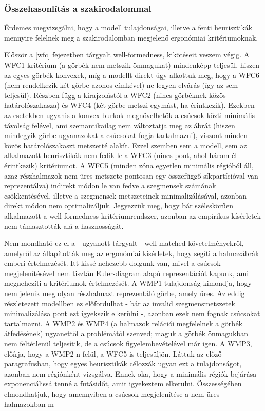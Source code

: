 \subsubsection{Összehasonlítás a szakirodalommal}

Érdemes megvizsgálni, hogy a modell tulajdonságai, illetve a fenti heurisztikák mennyire felelnek meg a szakirodalomban megjelenő ergonómiai kritériumoknak.


Először a \ref{wfc} fejezetben tárgyalt well-formedness, kikötéseit veszem végig. A WFC1 kritérium (a görbék nem metszik önmagukat) mindenképp teljesül, hiszen az egyes görbék konvexek, míg a modellt direkt úgy alkottuk meg, hogy a WFC6 (nem rendelkezik két görbe azonos címkével) ne legyen elvárás (így az sem teljesül). Részben függ a kirajzolástól a WFC2 (nincs görbéknek közös határolószakasza) és WFC4 (két görbe metszi egymást, ha érintkezik). Ezekben az esetekben ugyanis a konvex burkok megnövelhetők a csúcsok közti minimális távolság felével, ami szemantikailag nem változtatja meg az ábrát (hiszen mindegyik görbe ugyanazokat a csúcsokat fogja tartalmazni), viszont minden közös határolószakaszt metszetté alakít. Ezzel szemben sem a modell, sem az alkalmazott heurisztikák nem fedik le a WFC3 (nincs pont, ahol három él érintkezik) kritériumot. A WFC5 (minden zóna egyetlen minimális régióból áll, azaz részhalmazok nem üres metszete pontosan egy összefüggő síkpartícióval van reprezentálva) indirekt módon le van fedve a szegmensek számának csökkentésével, illetve a szegmensek metszeteinek minimalizálásával, azonban direkt módon nem optimalizáljuk. Jegyezzük meg, hogy bár széleskörűen alkalmazott a well-formedness kritériumrendszer, azonban az empirikus kísérletek nem támasztották alá a hasznosságát.


Nem mondható ez el a - ugyanott tárgyalt - well-matched követelményekről, amelyről az állapították meg az ergonómiai kísérletek, hogy segíti a halmazábrák emberi értelmezését. Itt kissé nehezebb dolgunk van, mivel a csúcsok megjelenítésével nem tisztán Euler-diagram alapú reprezentációt kapunk, ami megnehezíti a kritériumok értelmezését. A WMP1 tulajdonság kimondja, hogy nem jelenik meg olyan részhalmazt reprezentáló görbe, amely üres. Az eddig részletezett modellben ez előfordulhat - bár az invalid szegmensmetszetek minimalizálása pont ezt igyekszik elkerülni -, azonban ezek nem fognak csúcsokat tartalmazni. A WMP2 és WMP4 (a halmazok relációi megfelelnek a görbék átfedésének) ugyanettől a problémától szenved; maguk a görbék önmagukban nem feltétlenül teljesítik, de a csúcsok figyelembevételével már igen. A WMP3, előírja, hogy  a WMP2-n felül, a WFC5 is teljesüljön. Láttuk az előző paragrafusban, hogy egyes heurisztikák célozzák ugyan ezt a tulajdonságot, azonban nem régiónként vizsgálva. Ennek oka, hogy a minimális régiók bejárása exponenciálissá tenné a futásidőt, amit igyekeztem elkerülni. Összességében elmondhatjuk, hogy amennyiben a csúcsok megjelenítése a nem üres halmazokban m


